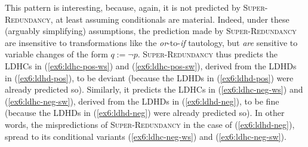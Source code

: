 This pattern is interesting, because, again, it is not predicted by \textsc{Super-Redundancy}, at least assuming conditionals are material. Indeed, under these (arguably simplifying) assumptions, the prediction made by \textsc{Super-Redundancy} are insensitive to transformations like the \textit{or}-to-\textit{if} tautology, but \textit{are} sensitive to variable changes of the form $q := \neg p$. \textsc{Super-Redundancy} thus predicts the LDHCs in (\ref{ex6:ldhc-pos-ws}) and (\ref{ex6:ldhc-pos-sw}), derived from the LDHDs in (\ref{ex6:ldhd-pos}), to be deviant (because the LDHDs in (\ref{ex6:ldhd-pos}) were already predicted so). Similarly, it predicts the LDHCs in (\ref{ex6:ldhc-neg-ws}) and (\ref{ex6:ldhc-neg-sw}), derived from the LDHDs in (\ref{ex6:ldhd-neg}), to be fine (because the LDHDs in (\ref{ex6:ldhd-neg}) were already predicted so). In other words, the mispredictions of \textsc{Super-Redundancy} in the case of (\ref{ex6:ldhd-neg}), spread to its conditional variants (\ref{ex6:ldhc-neg-ws}) and (\ref{ex6:ldhc-neg-sw}).\\


